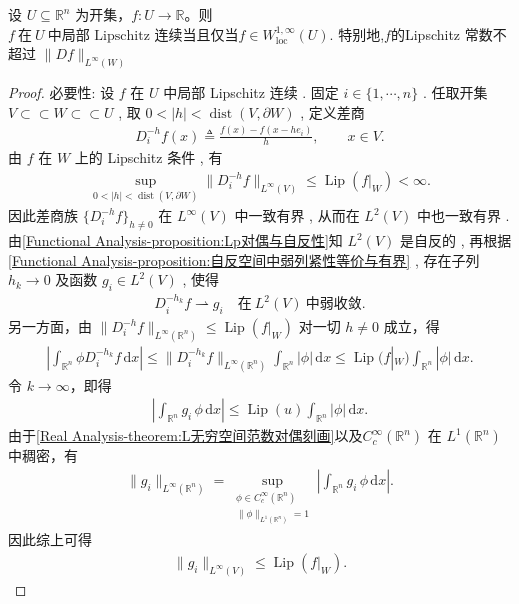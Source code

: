 \documentclass[../../main.tex]{subfiles}
\begin{document}
\begin{theorem}\label{theorem:ch05-W1infty局部刻画}
设 $U \subseteq \mathbb{R}^n$ 为开集，$f: U \to \mathbb{R}$。则
$f\ \text{在}\ U\ \text{中局部 Lipschitz 连续当且仅当}f \in W^{1,\infty}_{\mathrm{loc}}(U).$
特别地,$f$的Lipschitz 常数不超过 \(\|Df\|_{L^\infty(W)}\)
\end{theorem}
\begin{proof}

{\heiti 必要性:}
设 $f$ 在 $U$ 中局部 Lipschitz 连续 . 固定 $i\in\{1,\cdots,n\}$ . 任取开集 $V \subset\subset W \subset\subset U$ , 取 $0<|h|<\operatorname{dist}(V,\partial W)$ , 定义差商
\begin{align}\label{eq:局部差商定义}
D_{i}^{-h}f(x)\triangleq\frac{f(x)-f(x-he_i)}{h},\qquad x\in V.
\end{align}
由 $f$ 在 $W$ 上的 Lipschitz 条件 , 有
\begin{align*}
\sup_{0<|h|<\operatorname{dist}(V,\partial W)}\|D_{i}^{-h}f\|_{L^\infty(V)}
\leqslant \operatorname{Lip}(f|_W)<\infty.
\end{align*}
因此差商族 $\{D_{i}^{-h}f\}_{h\neq 0}$ 在 $L^\infty(V)$ 中一致有界 , 从而在 $L^2(V)$ 中也一致有界 . 由\cref{Functional Analysis-proposition:Lp对偶与自反性}知 $L^2(V)$ 是自反的 , 再根据\cref{Functional Analysis-proposition:自反空间中弱列紧性等价与有界} , 存在子列 $h_k\to 0$ 及函数 $g_i\in L^2(V)$ , 使得
\begin{align*}
D_{i}^{-h_k}f\rightharpoonup g_i\quad\text{在}\ L^2(V)\ \text{中弱收敛}.
\end{align*}
另一方面，由 $\|D_i^{-h}f\|_{L^\infty(\mathbb{R}^n)}\leqslant \operatorname{Lip}(f|_W)$ 对一切 $h\neq 0$ 成立，得
\begin{align*}
\left|\int_{\mathbb{R}^n}\phi D_i^{-h_k}f\,\mathrm{d}x\right|
\leqslant \|D_i^{-h_k}f\|_{L^\infty(\mathbb{R}^n)}\int_{\mathbb{R}^n}|\phi|\,\mathrm{d}x
\leqslant \operatorname{Lip}(f|_W)\int_{\mathbb{R}^n}|\phi|\,\mathrm{d}x.
\end{align*}
令 $k\to\infty$，即得
\begin{align*}
\left|\int_{\mathbb{R}^n}g_i\,\phi\,\mathrm{d}x\right|
\leqslant \operatorname{Lip}(u)\int_{\mathbb{R}^n}|\phi|\,\mathrm{d}x.
\end{align*}
由于\cref{Real Analysis-theorem:L无穷空间范数对偶刻画}以及$C_c^\infty(\mathbb{R}^n)$ 在 $L^1(\mathbb{R}^n)$ 中稠密，有
\begin{align*}
\|g_i\|_{L^\infty(\mathbb{R}^n)}
=\sup_{\substack{\phi\in C_c^\infty(\mathbb{R}^n)\\ \|\phi\|_{L^1(\mathbb{R}^n)}= 1}}
\left|\int_{\mathbb{R}^n}g_i\,\phi\,\mathrm{d}x\right|.
\end{align*}
因此综上可得
\begin{align}\label{eq:局部弱极限L无穷界}
\|g_i\|_{L^\infty(V)}\leqslant \operatorname{Lip}(f|_W).
\end{align}


\end{proof}
\end{document}
